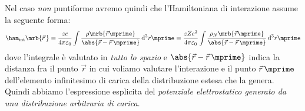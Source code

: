 Nel caso \textit{non} puntiforme avremo quindi che l'Hamiltoniana di
interazione assume la seguente forma:
\begin{equation}
  \ham_\text{int} \mrb{\vec{r}\,} = \frac{ze}{4\pi \varepsilon_0} \int
  \frac{\rho\mrb{\vec{r}\mprime}}{\abs{\vec{r} - \vec{r}\,\mprime}} \,
  \mathrm{d}^3r\mprime
  = \frac{zZe^2}{4\pi \varepsilon_0} \int
  \frac{\rho_N\mrb{\vec{r}\mprime}}{\abs{\vec{r} - \vec{r}\,\mprime}} \,
  \mathrm{d}^3r\mprime
	\label{eq:ham_int_estesa}
\end{equation}
dove l'integrale è valutato in \textit{tutto lo spazio} e $\abs{\vec{r} -
\vec{r}\,\mprime}$ indica la distanza fra il punto $\vec{r}$ in cui voliamo
valutare l'interazione e il punto $\vec{r}\,\mprime$ dell'elemento infinitesimo
di carica della distribuzione estesa che la genera. Quindi abbiamo
l'espressione esplicita del \textit{potenziale elettrostatico generato da una
distribuzione arbitraria di carica}.

